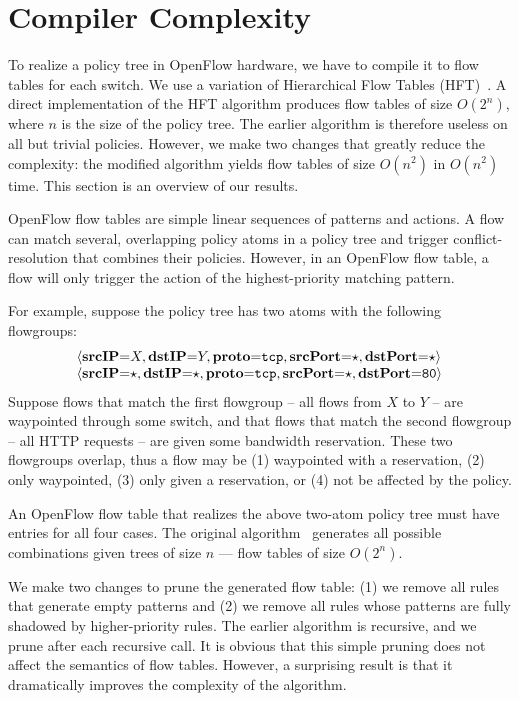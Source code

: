 \section{Compiler Complexity}
\label{sec:compiler-complexity}

To realize a policy tree in OpenFlow hardware, we have to compile it
to flow tables for each switch. We use a variation of
Hierarchical Flow Tables (HFT)~\cite{Ferguson:2012b}. A direct
implementation of the HFT algorithm produces flow tables of size
$O(2^n)$, where $n$ is the size of the policy tree. The earlier
algorithm is therefore useless on all but trivial policies.  However,
we make two changes that greatly reduce the complexity:
the modified algorithm yields flow tables
of size $O(n^2)$ in $O(n^2)$ time. This section is an overview of our
results. 

OpenFlow flow tables are simple linear
sequences of patterns and actions. A flow can match several,
overlapping policy atoms in a policy tree and trigger
conflict-resolution that combines their policies. However, in an
OpenFlow flow table, a flow will only trigger the action of the
highest-priority matching pattern.

For example, suppose the policy tree has two atoms with the following
flowgroups:
\[
\begin{array}{l}
\langle\textbf{srcIP}\mathord{=}X,\textbf{dstIP}\mathord{=}Y,\textbf{proto}\mathord{=}\texttt{tcp},\textbf{srcPort}\mathord{=}\star,\textbf{dstPort}\mathord{=}\star\rangle \\
\langle\textbf{srcIP}\mathord{=}\star,\textbf{dstIP}\mathord{=}\star,\textbf{proto}\mathord{=}\texttt{tcp},\textbf{srcPort}\mathord{=}\star,\textbf{dstPort}\mathord{=}\texttt{80}\rangle
\end{array}
\]
Suppose flows that match the first flowgroup -- all flows from $X$ to
$Y$ -- are waypointed through some switch, and that flows that match
the second flowgroup -- all HTTP requests -- are given some bandwidth
reservation.  These two flowgroups overlap, thus a flow may be (1)
waypointed with a reservation, (2) only waypointed, (3) only given a
reservation, or (4) not be affected by the policy.

An OpenFlow flow table that realizes the above two-atom policy tree must have
entries for all four cases.  The original algorithm~\cite{Ferguson:2012b}
generates all possible combinations given trees of size $n$ --- \ie flow tables
of size $O(2^n)$.

We make two changes to prune the generated flow table: (1) we remove
all rules that generate empty patterns and (2) we remove all rules
whose patterns are fully shadowed by higher-priority rules. The
earlier algorithm is recursive, and we prune after each recursive
call.  It is obvious that this simple pruning does not affect the
semantics of flow tables. However, a surprising result is that it
dramatically improves the complexity of the algorithm.

